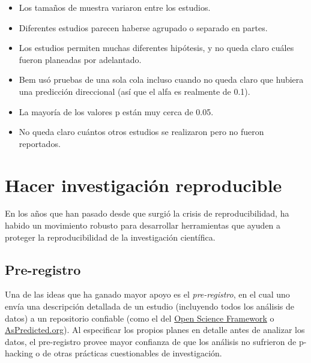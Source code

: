 \documentclass[
  12pt,
]{book}
\providecommand{\tightlist}{%
  \setlength{\itemsep}{0pt}\setlength{\parskip}{0pt}}
\theoremstyle{definition}
\theoremstyle{definition}
\theoremstyle{definition}
\theoremstyle{remark}
\begin{document}
\begin{itemize}
\tightlist
\item
  Los tamaños de muestra variaron entre los estudios.
\item
  Diferentes estudios parecen haberse agrupado o separado en partes.
\item
  Los estudios permiten muchas diferentes hipótesis, y no queda claro cuáles fueron planeadas por adelantado.
\item
  Bem usó pruebas de una sola cola incluso cuando no queda claro que hubiera una predicción direccional (así que el alfa es realmente de 0.1).
\item
  La mayoría de los valores p están muy cerca de 0.05.
\item
  No queda claro cuántos otros estudios se realizaron pero no fueron reportados.
\end{itemize}

\hypertarget{hacer-investigaciuxf3n-reproducible}{%
\section{Hacer investigación reproducible}\label{hacer-investigaciuxf3n-reproducible}}

En los años que han pasado desde que surgió la crisis de reproducibilidad, ha habido un movimiento robusto para desarrollar herramientas que ayuden a proteger la reproducibilidad de la investigación científica.

\hypertarget{pre-registro}{%
\subsection{Pre-registro}\label{pre-registro}}

Una de las ideas que ha ganado mayor apoyo es el \emph{pre-registro}, en el cual uno envía una descripción detallada de un estudio (incluyendo todos los análisis de datos) a un repositorio confiable (como el del \href{http://osf.io}{Open Science Framework} o \href{http://aspredicted.org}{AsPredicted.org}). Al especificar los propios planes en detalle antes de analizar los datos, el pre-registro provee mayor confianza de que los análisis no sufrieron de p-hacking o de otras prácticas cuestionables de investigación.
\end{document}
